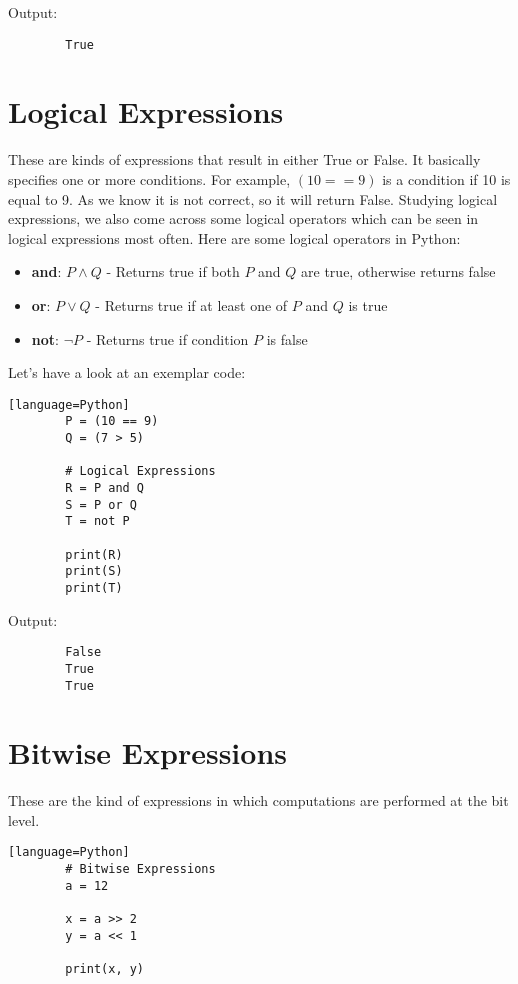 \documentclass{article}
\begin{document}
	Output:
	\begin{verbatim}
		True
	\end{verbatim}
	
	\section{Logical Expressions}
	
	These are kinds of expressions that result in either True or False. It basically specifies one or more conditions. For example, $(10 == 9)$ is a condition if 10 is equal to 9. As we know it is not correct, so it will return False. Studying logical expressions, we also come across some logical operators which can be seen in logical expressions most often. Here are some logical operators in Python:
	
\begin{itemize}
	\item \textbf{and}: $P \land Q$ - Returns true if both $P$ and $Q$ are true, otherwise returns false
	\item \textbf{or}: $P \lor Q$ - Returns true if at least one of $P$ and $Q$ is true
	\item \textbf{not}: $\lnot P$ - Returns true if condition $P$ is false
\end{itemize}
	
	Let’s have a look at an exemplar code:
	
	\begin{verbatim}[language=Python]
		P = (10 == 9) 
		Q = (7 > 5) 
		
		# Logical Expressions 
		R = P and Q 
		S = P or Q 
		T = not P 
		
		print(R) 
		print(S) 
		print(T)
	\end{verbatim}
	
	Output:
	\begin{verbatim}
		False
		True
		True
	\end{verbatim}
	
	\section{Bitwise Expressions}
	
	These are the kind of expressions in which computations are performed at the bit level.
	
	\begin{verbatim}[language=Python]
		# Bitwise Expressions 
		a = 12
		
		x = a >> 2
		y = a << 1
		
		print(x, y)
	\end{verbatim}
	
\end{document}
